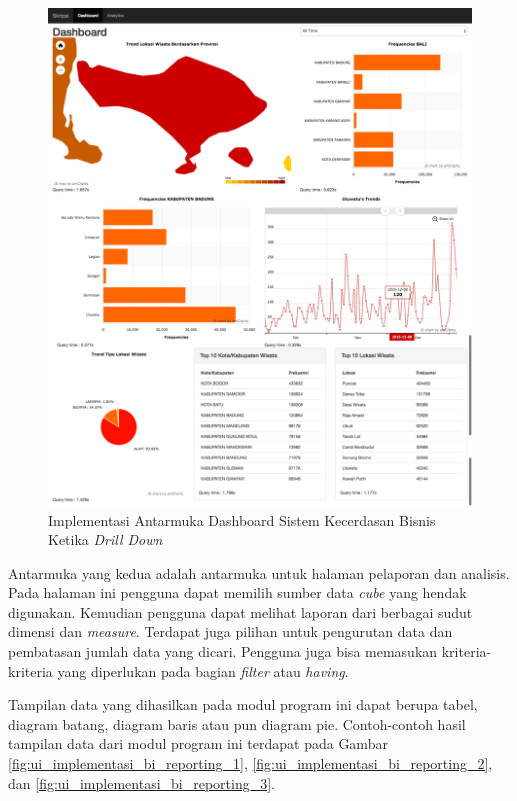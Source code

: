 \begin{figure}[H]
	\centering
	\includegraphics[scale=0.35]{Gambar/ui-implementasi-bi-dashboard-02.png}
	\caption[Implementasi Antarmuka Dashboard Sistem Kecerdasan Bisnis Ketika \textit{Drill Down}]{Implementasi Antarmuka Dashboard Sistem Kecerdasan Bisnis Ketika \textit{Drill Down}} 
	\label{fig:ui_implementasi_bi_dashboard_2}
\end{figure}

Antarmuka yang kedua adalah antarmuka untuk halaman pelaporan dan analisis. Pada halaman ini pengguna dapat memilih sumber data \textit{cube} yang hendak digunakan. Kemudian pengguna dapat melihat laporan dari berbagai sudut dimensi dan \textit{measure}. Terdapat juga pilihan untuk pengurutan data dan pembatasan jumlah data yang dicari. Pengguna juga bisa memasukan kriteria-kriteria yang diperlukan pada bagian \textit{filter} atau \textit{having}.

Tampilan data yang dihasilkan pada modul program ini dapat berupa tabel, diagram batang, diagram baris atau pun diagram pie. Contoh-contoh hasil tampilan data dari modul program ini terdapat pada Gambar \ref{fig:ui_implementasi_bi_reporting_1}, \ref{fig:ui_implementasi_bi_reporting_2}, dan \ref{fig:ui_implementasi_bi_reporting_3}.

